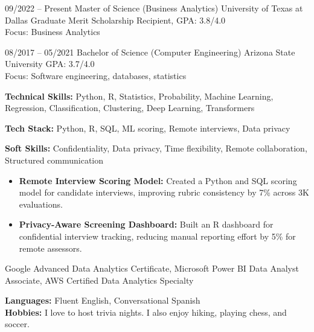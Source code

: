 \documentclass[10pt]{developercv}
\begin{document}
\begin{entrylist}

  \entry
  {09/2022 -- Present}
  {Master of Science (Business Analytics)}
  {University of Texas at Dallas}
  {Graduate Merit Scholarship Recipient, GPA: 3.8/4.0 \\Focus: Business Analytics}


  \entry
  {08/2017 -- 05/2021}
  {Bachelor of Science (Computer Engineering)}
  {Arizona State University}
  {GPA: 3.7/4.0 \\Focus: Software engineering, databases, statistics}

\end{entrylist}

\vspace{0.5cm}

\textbf{Technical Skills:} Python, R, Statistics, Probability, Machine Learning, Regression, Classification, Clustering, Deep Learning, Transformers

\textbf{Tech Stack:} Python, R, SQL, ML scoring, Remote interviews, Data privacy

\textbf{Soft Skills:} Confidentiality, Data privacy, Time flexibility, Remote collaboration, Structured communication


\begin{itemize}[leftmargin=*]
    \item \textbf{Remote Interview Scoring Model:} Created a Python and SQL scoring model for candidate interviews, improving rubric consistency by 7\% across 3K evaluations.
    \item \textbf{Privacy-Aware Screening Dashboard:} Built an R dashboard for confidential interview tracking, reducing manual reporting effort by 5\% for remote assessors.
\end{itemize}




Google Advanced Data Analytics Certificate, Microsoft Power BI Data Analyst Associate, AWS Certified Data Analytics Specialty





\textbf{Languages:} Fluent English, Conversational Spanish\\[0.05cm]

\textbf{Hobbies:} I love to host trivia nights. I also enjoy hiking, playing chess, and soccer.
\end{document}
